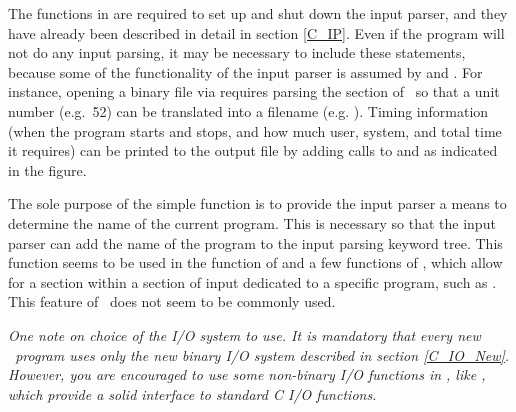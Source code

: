 The functions in  are required to set up and shut down the
input parser, and they have already been described in detail in section
\ref{C_IP}.  Even if the program will not do any input parsing, it may be
necessary to include these statements, because some of the functionality of
the input parser is assumed by  and .
For instance, opening a binary file via  requires
parsing the  section of
\ so that a unit number (e.g.~52) can be translated into a
filename (e.g. ).  Timing information (when the program starts 
and stops, and how much user, system,
and total time it requires) can be printed to the output file by adding
calls to  and  as indicated in the figure.

The sole purpose of the simple function  is to provide the
input parser a means to determine the name of the current program.  This is
necessary so that the input parser can add the name of the program to the
input parsing keyword tree.  This function seems to be used in
the  function of  and a few functions of
, which allow for
a  section within a section of input dedicated to a specific
program, such as \PSIcscf.  This feature of \PSIthree\ does not seem to be
commonly used.

{\em One note on choice of the I/O system to use. It is mandatory that
every new \PSIthree\ program uses only the new binary I/O system described in
section \ref{C_IO_New}. However, you are encouraged to use some non-binary
I/O functions in , like , which provide
a solid interface to standard C I/O functions.}
